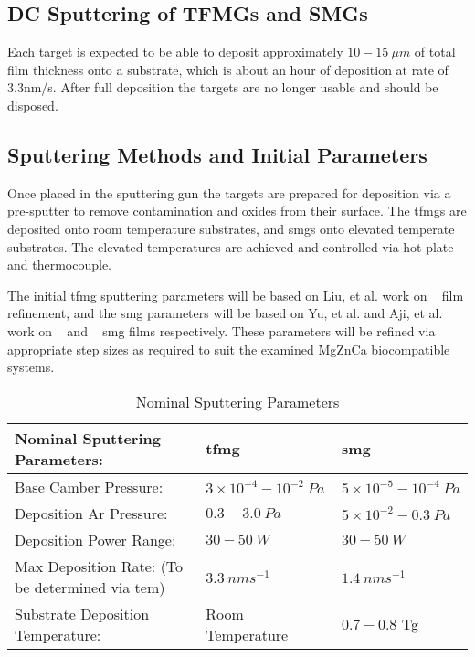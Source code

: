 \documentclass[a4paper,12pt,oneside]{report}%
\begin{document}
\subsection{DC Sputtering of TFMGs and SMGs}
Each target is expected to be able to deposit approximately $10 - 15~ \mu m$ of total film thickness onto a substrate, which is about an hour of deposition at rate of 3.3nm/s. After full deposition the targets are no longer usable and should be disposed. 

\subsection{Sputtering Methods and Initial Parameters}
Once placed in the sputtering gun the targets are prepared for deposition via a pre-sputter to remove contamination and oxides from their surface. The \glspl{tfmg} are deposited onto room temperature substrates, and \glspl{smg} onto elevated temperate substrates. The elevated temperatures are achieved and controlled via hot plate and thermocouple.

The initial \gls{tfmg} sputtering parameters will be based on Liu, et al. \cite{Liu2012} work on \ZrCuNiAl~ film refinement, and the \gls{smg} parameters will be based on Yu, et al. \cite{Yu2013} and Aji, et al. \cite{Aji2013} work on \ZrCuAl~ and \ZrCuNiAl~ \gls{smg} films respectively. These parameters will be refined via appropriate step sizes as required to suit the examined MgZnCa biocompatible systems. 

\begin{table}[h]
	\centering
	\begin{tabular}{ l l l }
		\toprule
		Nominal Sputtering Parameters: & \acrshort{tfmg} & \acrshort{smg} \\
		\midrule
		Base Camber Pressure: & $3 \times 10^{-4} - 10^{-2}~ Pa$ & $5 \times 10^{-5} - 10^{-4}~ Pa$ \\
		Deposition Ar Pressure:	& $0.3 - 3.0~ Pa$ & $5\times 10^{-2} - 0.3~ Pa$\\
		Deposition Power Range:	& $30 - 50~ W$ & $30 - 50~ W$\\
		Max Deposition Rate: (To be determined via \acrshort{tem}) & $3.3~ nm s^{-1}$ & $1.4~ nm s^{-1}$ \\	 
		Substrate Deposition Temperature: & Room Temperature & $0.7 - 0.8$ \acrshort{Tg} \\
		\bottomrule
	\end{tabular}
	\caption{Nominal Sputtering Parameters}
	\label{tab:NomSputterParameters}
\end{table}  	
\end{document}
